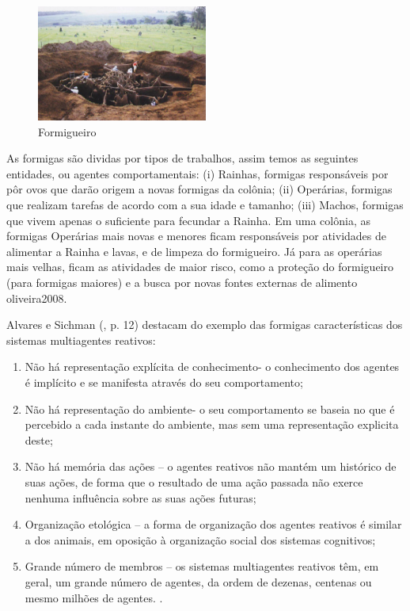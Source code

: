 \begin{figure}[h]
\centering
\label{f02}
\includegraphics[width=0.5\textwidth]{figuras/f02}
\caption{Formigueiro }

\end{figure}

As formigas são dividas por tipos de trabalhos, assim temos as seguintes entidades, ou agentes comportamentais: (i) Rainhas, formigas responsáveis por pôr ovos que darão origem a novas formigas da colônia; (ii) Operárias, formigas que realizam tarefas de acordo com a sua idade e tamanho; (iii) Machos, formigas que vivem apenas o suficiente para fecundar a Rainha. Em uma colônia, as formigas Operárias mais novas e menores ficam responsáveis por atividades de alimentar a Rainha e lavas, e de limpeza do formigueiro. Já para as operárias mais velhas, ficam as atividades de maior risco, como a proteção do formigueiro (para formigas maiores) e a busca por novas fontes externas de alimento  {oliveira2008}.

Alvares e Sichman (\citeyear{alvares1997}, p. 12) destacam do exemplo das formigas características dos sistemas multiagentes reativos:

\begin{citacao}
\begin{enumerate}

	\item Não há representação explícita de conhecimento- o conhecimento dos agentes é implícito e se manifesta através do seu comportamento;

	\item Não há representação do ambiente- o seu comportamento se baseia no que é percebido a cada instante do ambiente, mas sem uma representação explicita deste; 

	\item Não há memória das ações – o agentes reativos não mantém um histórico de suas ações, de forma que o resultado de uma ação passada não exerce nenhuma influência sobre as suas ações futuras;


	\item Organização etológica – a forma de organização dos agentes reativos é similar a dos animais, em oposição à organização social dos sistemas cognitivos;

 	\item Grande número de membros – os sistemas multiagentes reativos têm, em geral, um grande número de agentes, da ordem de dezenas, centenas ou mesmo milhões de agentes.
 	\newline \cite[p. 12]{alvares1997}.

\end{enumerate}
\end{citacao}


